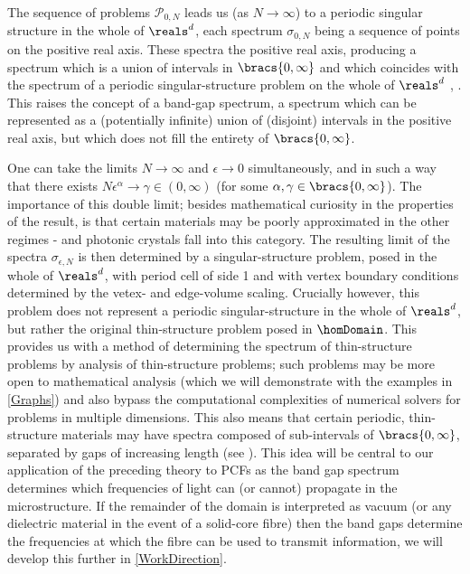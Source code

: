 The sequence of problems $\mathcal{P}_{0, N}$ leads us (as $N\rightarrow\infty$) to a periodic singular structure in the whole of $\reals^{d}$, each spectrum $\sigma_{0, N}$ being a sequence of points on the positive real axis.
These spectra  the positive real axis, producing a spectrum which is a union of intervals in $\bracs{0,\infty}$ and which coincides with the spectrum of a periodic singular-structure problem on the whole of $\reals^{d}$ \cite{exner2005convergence}, \cite{kuchment2001convergence}. 
This raises the concept of a band-gap spectrum, a spectrum which can be represented as a (potentially infinite) union of (disjoint) intervals in the positive real axis, but which does not fill the entirety of $\bracs{0,\infty}$. \newline

One can take the limits $N\rightarrow\infty$ and $\epsilon\rightarrow0$ simultaneously, and in such a way that there exists $N\epsilon^{\alpha}\rightarrow\gamma\in(0,\infty)$ (for some $\alpha, \gamma\in\bracs{0,\infty}$).
The importance of this double limit; besides mathematical curiosity in the properties of the result, is that certain materials may be poorly approximated in the other regimes - and photonic crystals fall into this category.
The resulting limit of the spectra $\sigma_{\epsilon, N}$ is then determined by a singular-structure problem, posed in the whole of $\reals^{d}$, with period cell of side 1 and with vertex boundary conditions determined by the vetex- and edge-volume scaling.
Crucially however, this problem does not represent a periodic singular-structure in the whole of $\reals^{d}$, but rather the original thin-structure problem posed in $\homDomain$.
This provides us with a method of determining the spectrum of thin-structure problems by analysis of thin-structure problems; such problems may be more open to mathematical analysis (which we will demonstrate with the examples in \cref{Graphs}) and also bypass the computational complexities of numerical solvers for problems in multiple dimensions.
This also means that certain periodic, thin-structure materials may have spectra composed of sub-intervals of $\bracs{0,\infty}$, separated by gaps of increasing length (see ).
This idea will be central to our application of the preceding theory to PCFs as the band gap spectrum determines which frequencies of light can (or cannot) propagate in the microstructure.
If the remainder of the domain is interpreted as vacuum (or any dielectric material in the event of a solid-core fibre) then the band gaps determine the frequencies at which the fibre can be used to transmit information, we will develop this further in \cref{WorkDirection}.

